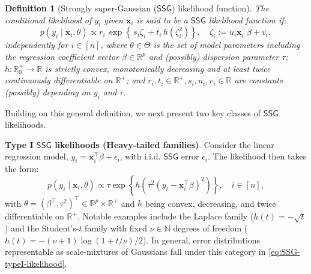 \documentclass[12pt]{article}
\newtheorem{definition}{Definition}[section]
\numberwithin{equation}{section}
\newcommand{\ssg}{\mathsf{SSG}}
\begin{document}
\begin{definition}[Strongly super-Gaussian ($\mathsf{SSG}$) likelihood function]
\label{def:SSG}
The conditional likelihood of $y_i$ given $\mathbf{x}_i$ is said to be a {$\ssg$} likelihood function if:
%
\begin{equation}\label{eq:SSG-defintion}
p(y_i \mid \mathbf{x}_i, \theta) \propto r_i \, \exp \left\{\,s_i \zeta_i + t_i\,h(\zeta_i^2)\right\},\quad \zeta_i := u_i \mathbf{x}_i^{\top}\beta + v_i,
\end{equation}
%
independently for $i\in [n]$, where $\theta\in \Theta$ is the set of model parameters including the regression coefficient vector $\beta \in \mathbb{R}^{p}$ and (possibly) dispersion parameter $\tau$;  $h:\mathbb{R}^{+}_{0} \to \mathbb{R}$ is strictly convex, monotonically decreasing and at least twice continuously differentiable on $\mathbb{R}^{+}$; and $r_i, t_i \in \mathbb{R}^{+}, s_i, u_i, v_i\in \mathbb{R}$ are constants (possibly) depending on $y_i$ and $\tau$. 
\end{definition}
Building on this general definition, we next present two key classes of $\ssg$ likelihoods. 

\textbf{Type I $\ssg$ likelihoods (Heavy-tailed families)}. Consider the linear regression model, $y_i = \mathbf{x}_i^{\top}\beta + \epsilon_i$, with i.i.d. $\ssg$ error $\epsilon_i$. The likelihood then takes the form:
%
\begin{equation}
\label{eq:SSG-typeI-likelihood}
p(y_i \mid \mathbf{x}_i, \theta) \propto \tau \exp\left\{h\left(\tau^2(y_i - \mathbf{x}_i^{\top}\beta)^2\right)\right\}, \quad i\in [n],
\end{equation}
%
with $\theta = (\beta^{\top}, \tau^2)^{\top} \in \mathbb{R}^p \times \mathbb{R}^{+}$ and $h$ being convex, decreasing, and twice differentiable on $\mathbb{R}^{+}$. Notable examples include the {Laplace} family ($h(t) =-\sqrt{t}$) and the {Student's-$t$} family with fixed $\nu \in \mathbb{N}$ degrees of freedom ($h(t) =-(\nu + 1) \log (1 + t/\nu)/2$). In general, error distributions representable as scale-mixtures of Gaussians fall under this category in \eqref{eq:SSG-typeI-likelihood}.
\end{document}
